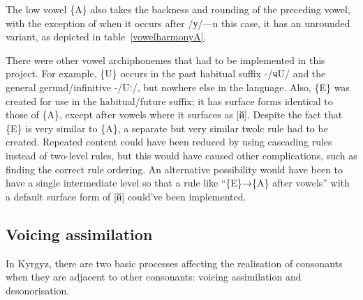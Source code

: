 \documentclass[10pt,a4paper,twocolumn]{article}
\begin{document}
The low vowel \{A\} also takes the backness and rounding of the preceding vowel, with the exception of when it occurs after /у/---n this case, it has an unrounded variant, as depicted in table~\ref{vowelharmonyA}.

\begin{table}[htbp]
	\centering
	\caption{Vowel harmony for archiphoneme \{A\}}\label{vowelharmonyA}
	\hspace{2em}
\end{table}

There were other vowel archiphonemes that had to be implemented in this project.  For example, \{U\} occurs in the past habitual suffix -/чU/ and the general gerund/infinitive -/Uː/, but nowhere else in the language.  Also, \{E\} was created for use in the habitual/future suffix; it has surface forms identical to those of \{A\}, except after vowels where it surfaces as [й].  Despite the fact that \{E\} is very similar to \{A\}, a separate but very similar twolc rule had to be created.  Repeated content could have been reduced by using cascading rules instead of two-level rules, but this would have caused other complications, such as finding the correct rule ordering.  An alternative possibility would have been to have a single intermediate level so that a rule like ``\{E\}→\{A\} after vowels'' with a default surface form of [й] could've been implemented.


\subsection{Voicing assimilation}\label{devoicing}
In Kyrgyz, there are two basic processes affecting the realisation of consonants when they are adjacent to other consonants: voicing assimilation and desonorisation.
\end{document}
